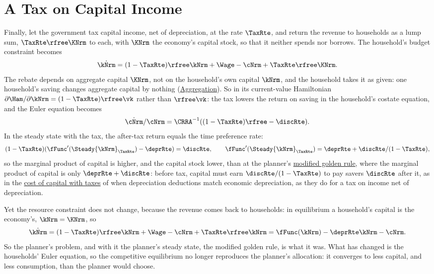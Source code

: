 \documentclass{econark}
\begin{document}
\section{A Tax on Capital Income}\label{sec:RCKGov-CapitalTax}

Finally, let the government tax capital income, net of depreciation, at the rate $\TaxRte$, and return the revenue to households as a lump sum, $\TaxRte\rfree\KNrm$ to each, with $\KNrm$ the economy's capital stock, so that it neither spends nor borrows. The household's budget constraint becomes
\begin{equation*}
  \dot{\kNrm} = (1-\TaxRte)\rfree\kNrm + \Wage - \cNrm + \TaxRte\rfree\KNrm .
\end{equation*}
The rebate depends on aggregate capital $\KNrm$, not on the household's own capital $\kNrm$, and the household takes it as given: one household's saving changes aggregate capital by nothing (\href{https://intertemporal-choice.github.io/content/appendices/mathematical/aggregation/}{Aggregation}). So in its current-value Hamiltonian $\partial\Ham/\partial\kNrm = (1-\TaxRte)\rfree\vk$ rather than $\rfree\vk$: the tax lowers the return on saving in the household's costate equation, and the Euler equation becomes
\begin{equation*}
  \dot{\cNrm}/\cNrm = \CRRA^{-1}((1-\TaxRte)\rfree - \discRte) .
\end{equation*}
In the steady state with the tax, the after-tax return equals the time preference rate:
\begin{equation}
  (1-\TaxRte)(\fFunc^{\prime}(\Steady{\kNrm}_{\TaxRte})-\deprRte) = \discRte, \qquad \fFunc^{\prime}(\Steady{\kNrm}_{\TaxRte}) = \deprRte + \discRte/(1-\TaxRte) , \label{eq:RCKGov-kTaxSteady}
\end{equation}
so the marginal product of capital is higher, and the capital stock lower, than at the planner's \href{https://intertemporal-choice.github.io/content/growth/ramseycasskoopmans/\#eq-rck-modgoldenrule}{modified golden rule}, where the marginal product of capital is only $\deprRte + \discRte$: before tax, capital must earn $\discRte/(1-\TaxRte)$ to pay savers $\discRte$ after it, as in the \href{https://intertemporal-choice.github.io/content/investment/halljorgenson/\#halljorgensontaxes}{cost of capital with taxes} of \citet{hall&jorgenson:i} when depreciation deductions match economic depreciation, as they do for a tax on income net of depreciation.

Yet the resource constraint does not change, because the revenue comes back to households: in equilibrium a household's capital is the economy's, $\kNrm = \KNrm$, so
\begin{equation*}
  \dot{\kNrm} = (1-\TaxRte)\rfree\kNrm + \Wage - \cNrm + \TaxRte\rfree\kNrm = \fFunc(\kNrm) - \deprRte\kNrm - \cNrm .
\end{equation*}
So the planner's problem, and with it the planner's steady state, the modified golden rule, is what it was. What has changed is the households' Euler equation, so the competitive equilibrium no longer reproduces the planner's allocation: it converges to less capital, and less consumption, than the planner would choose.
\end{document}

